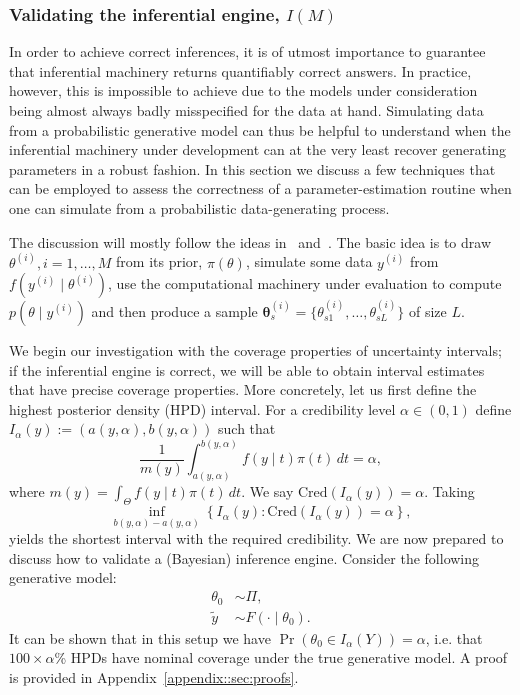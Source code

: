 \documentclass[oneside]{article}
\begin{document}
\subsubsection*{Validating the inferential engine, $I(M)$}
\label{sec:sbc}

In order to achieve correct inferences, it is of utmost importance to guarantee that inferential machinery returns quantifiably correct answers.
In practice, however, this is impossible to achieve due to the models under consideration being almost always badly misspecified for the data at hand.
Simulating data from a probabilistic generative model can thus be helpful to understand when the inferential machinery under development can at the very least recover generating parameters in a robust fashion.
In this section we discuss a few techniques that can be employed to assess the correctness of a parameter-estimation routine when one can simulate from a probabilistic data-generating process. 

The discussion will mostly follow the ideas in~\cite{Cook2006} and~\cite{Talts2018}.
The basic idea is to draw $\theta^{(i)}, i = 1, \ldots, M$ from its prior, $\pi(\theta)$, simulate some data $y^{(i)}$ from $f(y^{(i)} \mid \theta^{(i)})$, use the computational machinery under evaluation to compute $p(\theta \mid y^{(i)})$ and then produce a sample $\boldsymbol\theta_s^{(i)} = \{\theta_{s1}^{(i)}, \ldots, \theta_{sL}^{(i)}\}$ of size $L$.

We begin our investigation with the coverage properties of uncertainty intervals; if the inferential engine is correct, we will be able to obtain interval estimates that have precise coverage properties.
More concretely, let us first define the highest posterior density (HPD) interval.
For a credibility level $\alpha \in (0, 1)$ define $I_\alpha(y) := (a(y, \alpha), b(y, \alpha))$ such that
\begin{equation*}
 \frac{1}{m(y)} \int_{a(y, \alpha)}^{b(y,\alpha)} f(y \mid t)\pi(t)\,dt = \alpha,
\end{equation*}
where $m(y) = \int_{\Theta} f(y \mid t)\pi(t)\,dt$.
We say $\text{Cred}(I_\alpha(y)) = \alpha$.
Taking 
\begin{equation*}
 \inf_{b(y, \alpha)-a(y, \alpha)} \left \{ I_\alpha(y) : \text{Cred}(I_\alpha(y)) = \alpha \right\},
\end{equation*}
yields the shortest interval with the required credibility.
We are now prepared to discuss how to validate a (Bayesian) inference engine.
Consider the following generative model:
\begin{align*}
 \theta_0 &\sim \Pi,\\
 \tilde{y} &\sim F(\cdot \mid \theta_0).
\end{align*}
It can be shown that in this setup we have $\operatorname{Pr}\left(\theta_0 \in I_\alpha(Y) \right) = \alpha$, i.e. that $100\times\alpha$\% HPDs have nominal coverage under the true generative model.
A proof is provided in Appendix~\ref{appendix::sec:proofs}.
\end{document}
